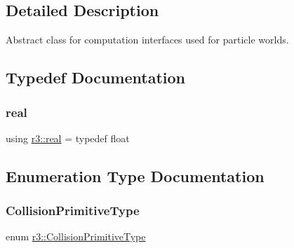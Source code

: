\subsection{Detailed Description}
Abstract class for computation interfaces used for particle worlds. 

\subsection{Typedef Documentation}
\mbox{\label{namespacer3_ab2016b3e3f743fb735afce242f0dc1eb}} 
\subsubsection{\texorpdfstring{real}{real}}
{\footnotesize\ttfamily using \mbox{\hyperlink{namespacer3_ab2016b3e3f743fb735afce242f0dc1eb}{r3\+::real}} = typedef float}



\subsection{Enumeration Type Documentation}
\mbox{\label{namespacer3_a7079ec5e42c1a55140d3bc093d49e319}} 
\subsubsection{\texorpdfstring{Collision\+Primitive\+Type}{CollisionPrimitiveType}}
{\footnotesize\ttfamily enum \mbox{\hyperlink{namespacer3_a7079ec5e42c1a55140d3bc093d49e319}{r3\+::\+Collision\+Primitive\+Type}}}

